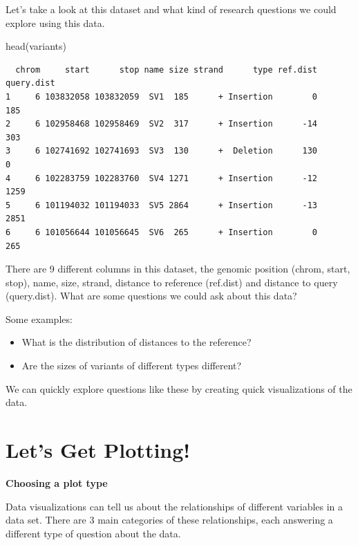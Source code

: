 \documentclass[
  letterpaper,
  DIV=11,
  numbers=noendperiod]{scrreprt}
\newenvironment{Shaded}{\begin{snugshade}}{\end{snugshade}}
\newcommand{\FunctionTok}[1]{\textcolor[rgb]{0.28,0.35,0.67}{#1}}
\newcommand{\NormalTok}[1]{\textcolor[rgb]{0.00,0.23,0.31}{#1}}
\begin{document}
Let's take a look at this dataset and what kind of research questions we
could explore using this data.

\begin{Shaded}
\begin{Highlighting}[]
\FunctionTok{head}\NormalTok{(variants)}
\end{Highlighting}
\end{Shaded}

\begin{verbatim}
  chrom     start      stop name size strand      type ref.dist query.dist
1     6 103832058 103832059  SV1  185      + Insertion        0        185
2     6 102958468 102958469  SV2  317      + Insertion      -14        303
3     6 102741692 102741693  SV3  130      +  Deletion      130          0
4     6 102283759 102283760  SV4 1271      + Insertion      -12       1259
5     6 101194032 101194033  SV5 2864      + Insertion      -13       2851
6     6 101056644 101056645  SV6  265      + Insertion        0        265
\end{verbatim}

There are 9 different columns in this dataset, the genomic position
(chrom, start, stop), name, size, strand, distance to reference
(ref.dist) and distance to query (query.dist). What are some questions
we could ask about this data?

Some examples:

\begin{itemize}
\item
  What is the distribution of distances to the reference?
\item
  Are the sizes of variants of different types different?
\end{itemize}

We can quickly explore questions like these by creating quick
visualizations of the data.

\section{Let's Get Plotting!}\label{lets-get-plotting-1}

\textbf{Choosing a plot type}

Data visualizations can tell us about the relationships of different
variables in a data set. There are 3 main categories of these
relationships, each answering a different type of question about the
data.
\end{document}
